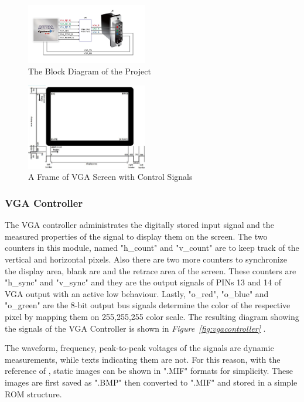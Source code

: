 \documentclass[paper]{IEEEtran}
\begin{document}
\begin{figure}[h!]
	\setlength{\unitlength}{\textwidth}
	\center 
	\includegraphics[width=0.47\textwidth]{VGAconfig}
	\caption{\label{fig:VGA_config}The Block Diagram of the Project}
\end{figure}

\begin{figure}[h!]
	\setlength{\unitlength}{\textwidth}
	\center 
	\includegraphics[width=0.47\textwidth]{vga-hsync-vsync}
	\caption{\label{fig:vga-hsync-vsync}A Frame of VGA Screen with Control Signals}
\end{figure}

\subsubsection{VGA Controller} \- \indent

The VGA controller administrates the digitally stored input signal and the measured properties of the signal to display them on the screen. The two counters in this module, named "h\_count" and "v\_count" are to keep track of the vertical and horizontal pixels. Also there are two more counters to synchronize the display area, blank are and the retrace area of the screen. These counters are "h\_sync" and "v\_sync" and they are the output signals of PINs 13 and 14 of VGA output with an active low behaviour. Lastly, "o\_red", "o\_blue" and "o\_green" are the 8-bit output bus signals determine the color of the respective pixel by mapping them on 255,255,255 color scale. The resulting diagram showing the signals of the VGA Controller is shown in  \textit{Figure~\ref{fig:vgacontroller}} \cite{b4}.

The waveform, frequency, peak-to-peak voltages of the signals are dynamic measurements, while texts indicating them are not. For this reason, with the reference of \cite{b2}, static images can be shown in ".MIF" formats for simplicity. These images are first saved as ".BMP" then converted to ".MIF" and stored in a simple ROM structure.
\end{document}
